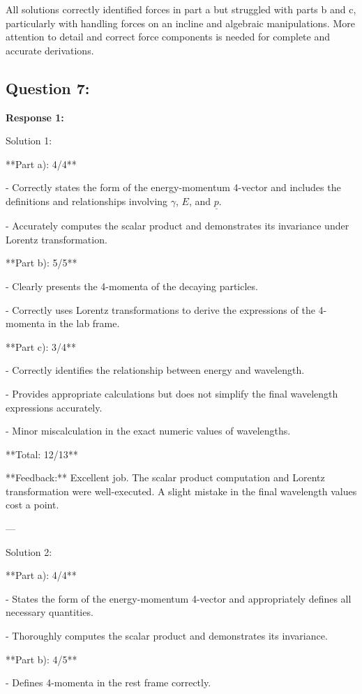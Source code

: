 \documentclass[a4paper,11pt]{article}
\begin{document}
All solutions correctly identified forces in part a but struggled with parts b and c, particularly with handling forces on an incline and algebraic manipulations. More attention to detail and correct force components is needed for complete and accurate derivations.


\subsection*{Question 7:}

\textbf{Response 1:}

Solution 1:

**Part a): 4/4**

- Correctly states the form of the energy-momentum 4-vector and includes the definitions and relationships involving \(\gamma\), \(E\), and \(\underline{p}\).

- Accurately computes the scalar product and demonstrates its invariance under Lorentz transformation.

**Part b): 5/5**

- Clearly presents the 4-momenta of the decaying particles.

- Correctly uses Lorentz transformations to derive the expressions of the 4-momenta in the lab frame.

**Part c): 3/4**

- Correctly identifies the relationship between energy and wavelength.

- Provides appropriate calculations but does not simplify the final wavelength expressions accurately.

- Minor miscalculation in the exact numeric values of wavelengths.

**Total: 12/13**

**Feedback:** Excellent job. The scalar product computation and Lorentz transformation were well-executed. A slight mistake in the final wavelength values cost a point.

---

Solution 2:

**Part a): 4/4**

- States the form of the energy-momentum 4-vector and appropriately defines all necessary quantities.

- Thoroughly computes the scalar product and demonstrates its invariance.

**Part b): 4/5**

- Defines 4-momenta in the rest frame correctly.
\end{document}
